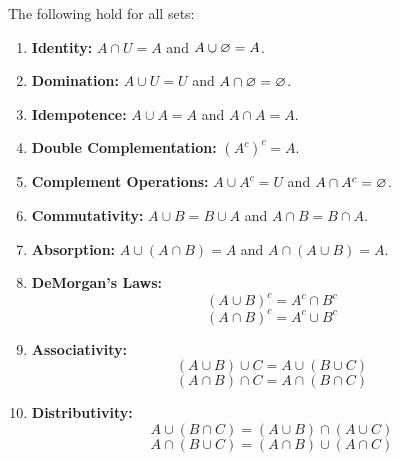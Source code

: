         \begin{theorem}\label{thm:setprop}
            The following hold for all sets:
            \begin{enumerate}
                \item \textbf{Identity:} $A \cap U = A$ and $A \cup \varnothing = A$.
                \item \textbf{Domination:} $A \cup U = U$ and $A \cap \varnothing = \varnothing$.
                \item \textbf{Idempotence:} $A \cup A = A$ and $A \cap A = A$.
                \item \textbf{Double Complementation:} $(A^c)^c = A$.
                \item \textbf{Complement Operations:} $A \cup A^c = U$ and $A \cap A^c = \varnothing$.
                \item \textbf{Commutativity:} $A \cup B = B \cup A$ and $A \cap B = B \cap A$.
                \item \textbf{Absorption:} $A \cup (A\cap B) = A$ and $A \cap (A \cup B) = A$.
                \item \textbf{DeMorgan's Laws:} $$(A \cup B)^c = A^c \cap B^c$$ $$(A \cap B)^c = A^c \cup B^c$$
                \item \textbf{Associativity:} $$(A \cup B) \cup C = A \cup (B \cup C)$$ $$(A \cap B) \cap C = A \cap (B \cap C)$$
                \item \textbf{Distributivity:} $$A \cup (B \cap C) = (A\cup B) \cap (A \cup C)$$ $$A \cap (B \cup C) = (A\cap B) \cup (A \cap C)$$
            \end{enumerate}
        \end{theorem}



